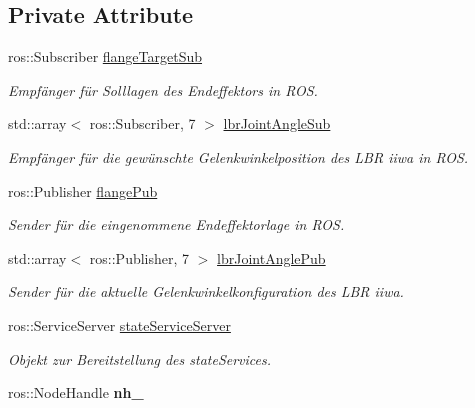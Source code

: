\subsection*{Private Attribute}
\begin{DoxyCompactItemize}
\item 
\hypertarget{classRosOpenIgtlBridge_a7f2d1b92afa2a0e5c5a96abf15e559fc}{ros\-::\-Subscriber \hyperlink{classRosOpenIgtlBridge_a7f2d1b92afa2a0e5c5a96abf15e559fc}{flange\-Target\-Sub}}\label{classRosOpenIgtlBridge_a7f2d1b92afa2a0e5c5a96abf15e559fc}

\begin{DoxyCompactList}\small\item\em Empfänger für Solllagen des Endeffektors in R\-O\-S. \end{DoxyCompactList}\item 
\hypertarget{classRosOpenIgtlBridge_a2cec061ef757bb52933768c2dd3fde1e}{std\-::array$<$ ros\-::\-Subscriber, 7 $>$ \hyperlink{classRosOpenIgtlBridge_a2cec061ef757bb52933768c2dd3fde1e}{lbr\-Joint\-Angle\-Sub}}\label{classRosOpenIgtlBridge_a2cec061ef757bb52933768c2dd3fde1e}

\begin{DoxyCompactList}\small\item\em Empfänger für die gewünschte Gelenkwinkelposition des L\-B\-R iiwa in R\-O\-S. \end{DoxyCompactList}\item 
\hypertarget{classRosOpenIgtlBridge_ac97a67c4e0f7afbc2811acb3857464e3}{ros\-::\-Publisher \hyperlink{classRosOpenIgtlBridge_ac97a67c4e0f7afbc2811acb3857464e3}{flange\-Pub}}\label{classRosOpenIgtlBridge_ac97a67c4e0f7afbc2811acb3857464e3}

\begin{DoxyCompactList}\small\item\em Sender für die eingenommene Endeffektorlage in R\-O\-S. \end{DoxyCompactList}\item 
\hypertarget{classRosOpenIgtlBridge_a777b34678fb3d17d5ad177b1e7ec1225}{std\-::array$<$ ros\-::\-Publisher, 7 $>$ \hyperlink{classRosOpenIgtlBridge_a777b34678fb3d17d5ad177b1e7ec1225}{lbr\-Joint\-Angle\-Pub}}\label{classRosOpenIgtlBridge_a777b34678fb3d17d5ad177b1e7ec1225}

\begin{DoxyCompactList}\small\item\em Sender für die aktuelle Gelenkwinkelkonfiguration des L\-B\-R iiwa. \end{DoxyCompactList}\item 
ros\-::\-Service\-Server \hyperlink{classRosOpenIgtlBridge_ad7c6b0430970a8faf6cc9e934d6f889e}{state\-Service\-Server}
\begin{DoxyCompactList}\small\item\em Objekt zur Bereitstellung des state\-Services. \end{DoxyCompactList}\item 
\hypertarget{classRosOpenIgtlBridge_a69a4a87ec19cd98435f0376f58f3e525}{ros\-::\-Node\-Handle {\bfseries nh\-\_\-}}\label{classRosOpenIgtlBridge_a69a4a87ec19cd98435f0376f58f3e525}


\end{DoxyCompactItemize}
